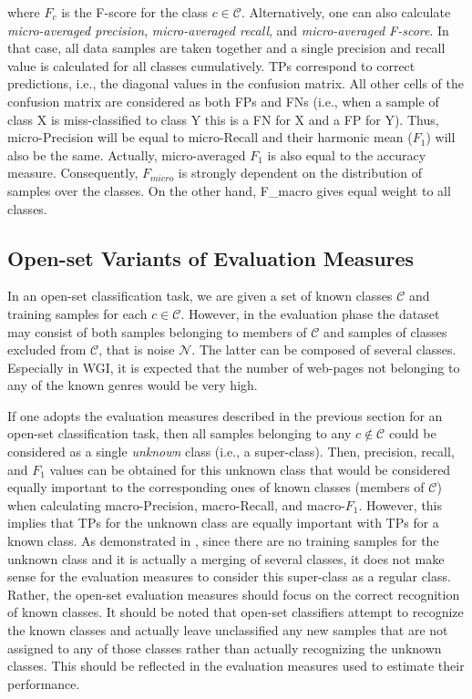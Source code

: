 \noindent 
where $F_c$ is the F-score for the class $c \in \mathcal{C}$. Alternatively, one can also calculate \textit{micro-averaged precision}, \textit{micro-averaged recall}, and \textit{micro-averaged F-score}. In that case, all data samples are taken together and a single precision and recall value is calculated for all classes cumulatively. TPs correspond to correct predictions, i.e., the diagonal values in the confusion matrix.  All other cells of the confusion matrix are considered as both FPs and FNs (i.e., when a sample of class X is miss-classified to class Y this is a FN for X and a FP for Y). Thus, micro-Precision will be equal to micro-Recall and their harmonic mean  ($F_{1}$) will also be the same. Actually, micro-averaged $F_{1}$ is also equal to the accuracy measure. Consequently, $F_{micro}$ is strongly dependent on the distribution of samples over the classes. On the other hand, F_{macro} gives equal weight to all classes.

\subsection{Open-set Variants of Evaluation Measures}

In an open-set classification task, we are given a set of known classes $\mathcal{C}$ and training samples for each $c \in \mathcal{C}$. However, in the evaluation phase the dataset may consist of both samples belonging to members of $\mathcal{C}$ and samples of classes excluded from $\mathcal{C}$, that is noise $\mathcal{N}$. The latter can be composed of several classes. Especially in WGI, it is expected that the number of web-pages not belonging to any of the known genres would be very high. 

If one adopts the evaluation measures described in the previous section for an open-set classification task, then all samples belonging to any $c \notin \mathcal{C}$ could be considered as a single \textit{unknown} class (i.e., a super-class). Then, precision, recall, and $F_{1}$ values can be obtained for this unknown class that would be considered equally important to the corresponding ones of known classes (members of $\mathcal{C}$) when calculating macro-Precision, macro-Recall, and macro-$F_{1}$. However, this implies that TPs for the unknown class are equally important with TPs for a known class. As demonstrated in \parencite{mendesjunior2016}, since there are no training samples for the unknown class and it is actually a merging of several classes, it does not make sense for the evaluation measures to consider this super-class as a regular class. Rather, the open-set evaluation measures should focus on the correct recognition of known classes. It should be noted that open-set classifiers attempt to recognize the known classes and actually leave unclassified any new samples that are not assigned to any of those classes rather than actually recognizing the unknown classes. This should be reflected in the evaluation measures used to estimate their performance. 

